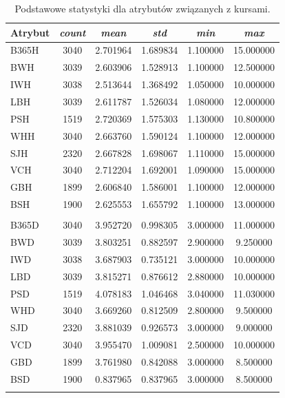     \begin{table}[H]
    \caption{Podstawowe statystyki dla atrybutów związanych z kursami.}\label{tab:odds}
    \centering\footnotesize%
    \begin{tabular}{l c c c c c}
    \toprule
        Atrybut & \emph{count} & \emph{mean} & \emph{std} & \emph{min} & \emph{max} \\
    \midrule
        B365H & 3040 & 2.701964 & 1.689834 & 1.100000 & 15.000000\\
        BWH & 3039 & 2.603906 & 1.528913 & 1.100000 & 12.500000\\
        IWH & 3038 & 2.513644 & 1.368492 & 1.050000 & 10.000000\\
        LBH & 3039 & 2.611787 & 1.526034 & 1.080000 & 12.000000\\
        PSH & 1519 & 2.720369 & 1.575303 & 1.130000 & 10.800000\\
        WHH & 3040 & 2.663760 & 1.590124 & 1.100000 & 12.000000\\
        SJH & 2320 & 2.667828 & 1.698067 & 1.110000 & 15.000000\\
        VCH & 3040 & 2.712204 & 1.692001 & 1.090000 & 15.000000\\
        GBH & 1899 & 2.606840 & 1.586001 & 1.100000 & 12.000000\\
        BSH & 1900 & 2.625553 & 1.655792 & 1.100000 & 13.000000\\\\
        
        B365D & 3040 & 3.952720 & 0.998305 & 3.000000 & 11.000000\\
        BWD & 3039 & 3.803251 & 0.882597 & 2.900000 & 9.250000\\
        IWD & 3038 & 3.687903 & 0.735121 & 3.000000 & 10.000000\\
        LBD & 3039 & 3.815271 & 0.876612 & 2.880000 & 10.000000\\
        PSD & 1519 & 4.078183 & 1.046468 & 3.040000 & 11.030000\\
        WHD & 3040 & 3.669260 & 0.812509 & 2.800000 & 9.500000\\
        SJD & 2320 & 3.881039 & 0.926573 & 3.000000 & 9.000000\\
        VCD & 3040 & 3.955470 & 1.009081 & 2.500000 & 10.000000\\
        GBD & 1899 & 3.761980 & 0.842088 & 3.000000 & 8.500000\\
        BSD & 1900 & 0.837965 & 0.837965 & 3.000000 & 8.500000\\\\
        

\end{tabular}
\end{table}
